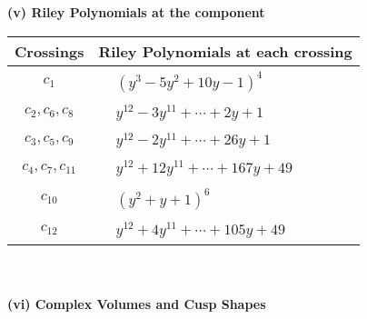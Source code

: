 \documentclass[1p]{elsarticle_modified}
\theoremstyle{definition}
\begin{document}
\newpage\renewcommand{\arraystretch}{1}
\flushleft \textbf{(v) Riley Polynomials at the component}\newline \\
\begin{tabular}{m{50pt}|m{274pt}}
Crossings & \hspace{64pt}Riley Polynomials at each crossing \\
\hline $$\begin{aligned}c_{1}\end{aligned}$$&$\begin{aligned}
&(y^3-5 y^2+10 y-1)^4
\end{aligned}$\\
\hline $$\begin{aligned}c_{2},c_{6},c_{8}\end{aligned}$$&$\begin{aligned}
&y^{12}-3 y^{11}+\cdots+2 y+1
\end{aligned}$\\
\hline $$\begin{aligned}c_{3},c_{5},c_{9}\end{aligned}$$&$\begin{aligned}
&y^{12}-2 y^{11}+\cdots+26 y+1
\end{aligned}$\\
\hline $$\begin{aligned}c_{4},c_{7},c_{11}\end{aligned}$$&$\begin{aligned}
&y^{12}+12 y^{11}+\cdots+167 y+49
\end{aligned}$\\
\hline $$\begin{aligned}c_{10}\end{aligned}$$&$\begin{aligned}
&(y^2+y+1)^6
\end{aligned}$\\
\hline $$\begin{aligned}c_{12}\end{aligned}$$&$\begin{aligned}
&y^{12}+4 y^{11}+\cdots+105 y+49
\end{aligned}$\\
\hline
\end{tabular}\\~\\
\newpage\flushleft \textbf{(vi) Complex Volumes and Cusp Shapes}
\end{document}
